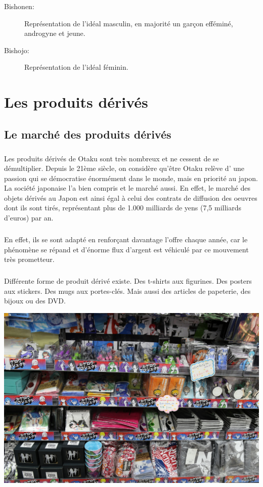 \begin{description}
	\item[Bishonen:] Représentation de l'idéal masculin, en majorité un garçon
		efféminé, androgyne et jeune.
	\item[Bishojo:] Représentation de l'idéal féminin.
\end{description}

\chapter{Les produits dérivés}

\section{Le marché des produits dérivés}

\paragraph{} Les produits dérivés de Otaku sont très nombreux et ne cessent de
se démultiplier. Depuis le 21ème siècle, on considère qu’être Otaku relève d’
une passion qui se démocratise énormément dans le monde, mais en priorité au
japon. La société japonaise l’a bien compris et le marché aussi. En effet, le
marché des objets dérivés au Japon est ainsi égal à celui des contrats de
diffusion des oeuvres dont ils sont tirés, représentant plus de 1.000 milliards
de yens (7,5 milliards d'euros) par an. 

\paragraph{} En effet, ils se sont adapté en renforçant davantage l'offre
chaque année, car le phénomène se répand et d'énorme flux d'argent est véhiculé
par ce mouvement très prometteur.

\paragraph{} Différente forme de produit dérivé existe. Des t-shirts aux
figurines. Des posters aux stickers. Des mugs aux portes-clés. Mais aussi des
articles de papeterie, des bijoux ou des DVD. 

\begin{center}
	\includegraphics[scale=0.15]{produit.jpg}
\end{center}

